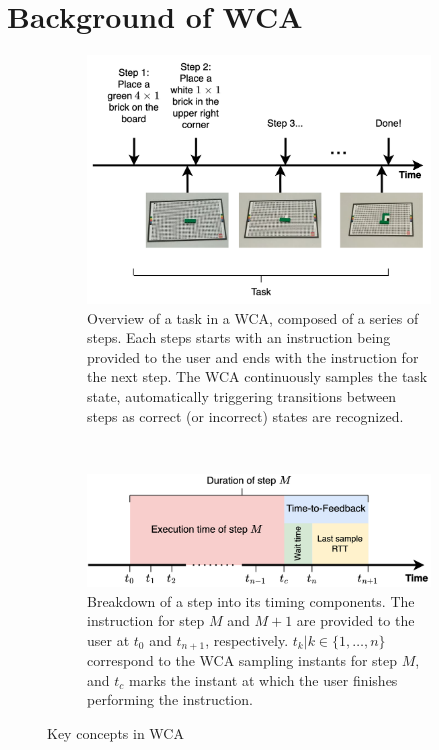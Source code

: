 \section{Background of \acs*{WCA}}\label{sec:background}

\begin{figure}
    \centering
    \begin{subfigure}{\columnwidth}
        \centering
        \includegraphics[width=\columnwidth]{figs/task.png}
        \caption{%
            Overview of a task in a \ac{WCA}, composed of a series of steps.
            Each steps starts with an instruction being provided to the user and ends with the instruction for the next step.
            The \ac{WCA} continuously samples the task state, automatically triggering transitions between steps as correct (or incorrect) states are recognized.
        }\label{fig:task}
    \end{subfigure}\\
    \begin{subfigure}{\columnwidth}
        \centering
        \includegraphics[width=\columnwidth]{figs/step_time.png}
        \caption{%
            Breakdown of a step into its timing components.
            The instruction for step \( M \) and \( M + 1 \) are provided to the user at \( t_0 \) and \( t_{n+1} \), respectively.
            \( t_k | k \in \{1, \ldots, n \} \) correspond to the \ac{WCA} sampling instants for step \( M \), and \( t_c \) marks the instant at which the user finishes performing the instruction.
        }\label{fig:step}
    \end{subfigure}
    \caption{Key concepts in \acl{WCA}}
\end{figure}

